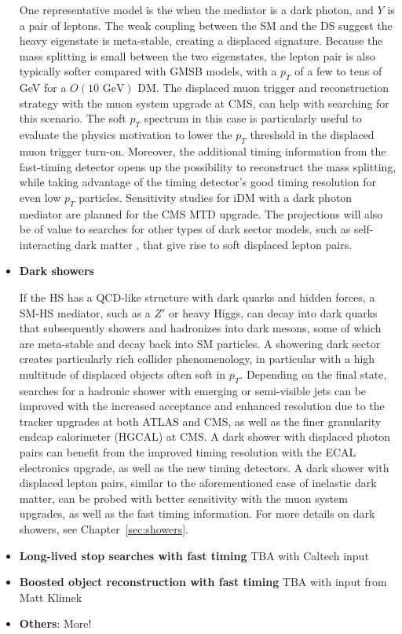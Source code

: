 \begin{itemize}
One representative model is the when the mediator is a dark photon, and $Y$ is a pair of leptons. 
The weak coupling between the SM and the DS suggest the heavy eigenstate is meta-stable, creating a displaced signature.
Because the mass splitting is small between the two eigenstates, the lepton pair is also typically softer compared with GMSB models, with a $p_T$ of a few to tens of GeV for a $O(10\,\,\mathrm{GeV})$ DM. 
The displaced muon trigger and reconstruction strategy with the muon system upgrade at CMS, can help with searching for this scenario. 
The soft $p_T$ spectrum in this case is particularly useful to evaluate the physics motivation to lower the $p_T$ threshold in the displaced muon trigger turn-on.
Moreover, the additional timing information from the fast-timing detector opens up the possibility to reconstruct the mass splitting, while taking advantage of the timing detector's good timing resolution for even low $p_T$ particles. 
Sensitivity studies for iDM with a dark photon mediator are planned for the CMS MTD upgrade. The projections will also be of value to searches for other types of dark sector models, such as self-interacting dark matter \cite{Hochberg:2014dra}, that give rise to soft displaced lepton pairs.

\item \textbf{Dark showers}

If the HS has a QCD-like structure with dark quarks and hidden forces, a SM-HS mediator, such as a $Z'$ or heavy Higgs, can decay into dark quarks that subsequently showers and hadronizes into dark mesons, some of which are meta-stable and decay back into SM particles. 
A showering dark sector creates particularly rich collider phenomenology, in particular with a high multitude of displaced objects often soft in $p_T$. 
Depending on the final state, searches for a hadronic shower with emerging \cite{Schwaller:2015gea} or semi-visible jets \cite{Cohen:2015toa} can be improved with the increased acceptance and enhanced resolution due to the tracker upgrades at both ATLAS and CMS, as well as the finer granularity endcap calorimeter (HGCAL) at CMS. 
A dark shower with displaced photon pairs can benefit from the improved timing resolution with the ECAL electronics upgrade, as well as the new timing detectors. 
A dark shower with displaced lepton pairs, similar to the aforementioned case of inelastic dark matter, can be probed with better sensitivity with the muon system upgrades, as well as the fast timing information. 
For more details on dark showers, see Chapter~\ref{sec:showers}.

\item \textbf{Long-lived stop searches with fast timing} 
TBA with Caltech input 

\item \textbf{Boosted object reconstruction with fast timing}
TBA with input from Matt Klimek

\item \textbf{Others}: More!
\end{itemize}

